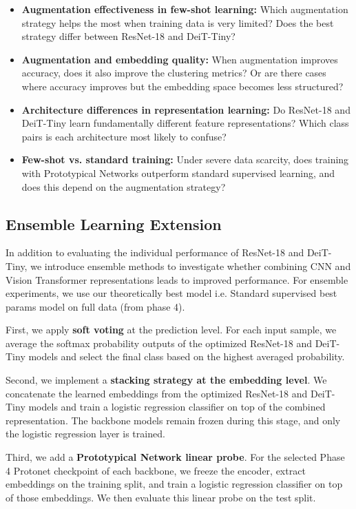 \documentclass[12pt,a4paper]{article}
\begin{document}
\begin{itemize}[nosep]
    \item \textbf{Augmentation effectiveness in few-shot learning:} Which augmentation strategy helps the most when training data is very limited? Does the best strategy differ between ResNet-18 and DeiT-Tiny?
    
    \item \textbf{Augmentation and embedding quality:} When augmentation improves accuracy, does it also improve the clustering metrics? Or are there cases where accuracy improves but the embedding space becomes less structured?
    
    \item \textbf{Architecture differences in representation learning:} Do ResNet-18 and DeiT-Tiny learn fundamentally different feature representations? Which class pairs is each architecture most likely to confuse?
    
    \item \textbf{Few-shot vs. standard training:} Under severe data scarcity, does training with Prototypical Networks outperform standard supervised learning, and does this depend on the augmentation strategy?
\end{itemize}

\subsection{Ensemble Learning Extension}

In addition to evaluating the individual performance of ResNet-18 and DeiT-Tiny, we introduce ensemble methods to investigate whether combining CNN and Vision Transformer representations leads to improved performance. For ensemble experiments, we use our theoretically best model i.e. Standard supervised best params model on full data (from phase 4).

First, we apply \textbf{soft voting} at the prediction level. For each input sample, we average the softmax probability outputs of the optimized ResNet-18 and DeiT-Tiny models and select the final class based on the highest averaged probability.

Second, we implement a \textbf{stacking strategy at the embedding level}. We concatenate the learned embeddings from the optimized ResNet-18 and DeiT-Tiny models and train a logistic regression classifier on top of the combined representation. The backbone models remain frozen during this stage, and only the logistic regression layer is trained.

Third, we add a \textbf{Prototypical Network linear probe}. For the selected Phase 4 Protonet checkpoint of each backbone, we freeze the encoder, extract embeddings on the training split, and train a logistic regression classifier on top of those embeddings. We then evaluate this linear probe on the test split. 
\end{document}
